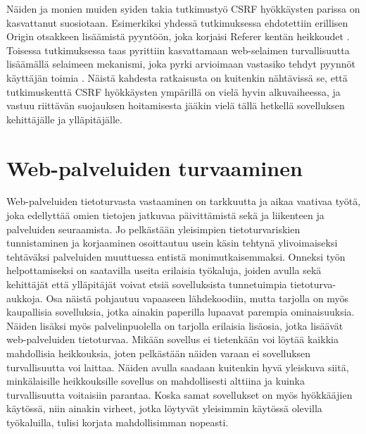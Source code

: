 Näiden ja monien muiden syiden takia tutkimustyö CSRF hyökkäysten parissa on kasvattanut suosiotaan. Esimerkiksi yhdessä tutkimuksessa ehdotettiin erillisen Origin
otsakkeen lisäämistä pyyntöön, joka korjaisi Referer kentän heikkoudet \cite{CSRF}. Toisessa tutkimuksessa taas pyrittiin kasvattamaan web-selaimen turvallisuutta
lisäämällä selaimeen mekanismi, joka pyrki arvioimaan vastasiko tehdyt pyynnöt käyttäjän toimia \cite{CSRFb}. Näistä kahdesta ratkaisusta on kuitenkin nähtävissä se,
että tutkimuskenttä CSRF hyökkäysten ympärillä on vielä hyvin alkuvaiheessa, ja vastuu riittävän suojauksen hoitamisesta jääkin vielä tällä hetkellä 
sovelluksen kehittäjälle ja ylläpitäjälle.

\section{Web-palveluiden turvaaminen}

Web-palveluiden tietoturvasta vastaaminen on tarkkuutta ja aikaa vaativaa työtä, joka edellyttää omien tietojen jatkuvaa päivittämistä sekä ja liikenteen ja palveluiden
seuraamista. Jo pelkästään yleisimpien tietoturvariskien tunnistaminen ja korjaaminen osoittautuu usein käsin tehtynä ylivoimaiseksi tehtäväksi palveluiden
muuttuessa entistä monimutkaisemmaksi. Onneksi työn helpottamiseksi on saatavilla useita erilaisia työkaluja, joiden avulla sekä kehittäjät että ylläpitäjät voivat
etsiä sovelluksista tunnetuimpia tietoturva-aukkoja. Osa näistä pohjautuu vapaaseen lähdekoodiin, mutta tarjolla on myös kaupallisia sovelluksia, jotka ainakin 
paperilla lupaavat parempia ominaisuuksia. Näiden lisäksi myös palvelinpuolella on tarjolla erilaisia lisäosia, jotka lisäävät web-palveluiden tietoturvaa. 
Mikään sovellus ei tietenkään voi löytää kaikkia mahdollisia heikkouksia, joten pelkästään näiden varaan ei sovelluksen turvallisuutta voi laittaa. Näiden avulla 
saadaan kuitenkin hyvä yleiskuva siitä, minkälaisille heikkouksille sovellus on mahdollisesti alttiina ja kuinka turvallisuutta voitaisiin parantaa. Koska samat 
sovellukset on myös hyökkääjien käytössä, niin ainakin virheet, jotka löytyvät yleisimmin käytössä olevilla työkaluilla, tulisi korjata mahdollisimman nopeasti. 

